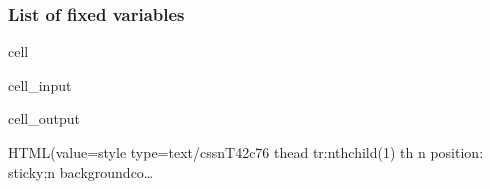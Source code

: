 \documentclass[letterpaper,10pt,english]{jupyterBook}
\begin{document}
\subsubsection{List of fixed variables}
\label{\detokenize{content/howto/fixing/Fixing variables:list-of-fixed-variables}}
\begin{sphinxuseclass}{cell}\begin{sphinxVerbatimInput}

\begin{sphinxuseclass}{cell_input}
\begin{sphinxVerbatim}[commandchars=\\\{\}]
 \PYG{p}{[}    
                 \PYG{p}{]}
  \PYG{p}{[}\PYG{p}{]}
\end{sphinxVerbatim}

\end{sphinxuseclass}\end{sphinxVerbatimInput}
\begin{sphinxVerbatimOutput}

\begin{sphinxuseclass}{cell_output}
\begin{sphinxVerbatim}[commandchars=\\\{\}]
HTML(value=\PYGZsq{}\PYGZlt{}style type=\PYGZdq{}text/css\PYGZdq{}\PYGZgt{}\PYGZbs{}n\PYGZsh{}T\PYGZus{}42c76 thead tr:nth\PYGZhy{}child(1) th \PYGZob{}\PYGZbs{}n  position: sticky;\PYGZbs{}n  background\PYGZhy{}co…
\end{sphinxVerbatim}

\end{sphinxuseclass}\end{sphinxVerbatimOutput}

\end{sphinxuseclass}
\end{document}
